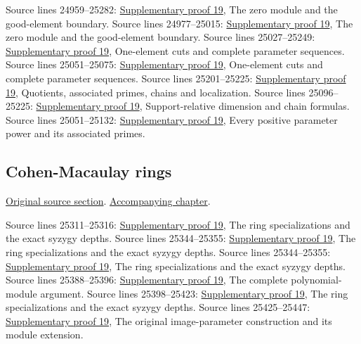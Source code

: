 \begin{AlgebraSourceRoutes}
 Source lines 24959--25282: \hyperlink{algebra_cm_modules_notes_20260928}{Supplementary proof 19}, The zero module and the good-element boundary.
 Source lines 24977--25015: \hyperlink{algebra_cm_modules_notes_20260928}{Supplementary proof 19}, The zero module and the good-element boundary.
 Source lines 25027--25249: \hyperlink{algebra_cm_modules_notes_20260928}{Supplementary proof 19}, One-element cuts and complete parameter sequences.
 Source lines 25051--25075: \hyperlink{algebra_cm_modules_notes_20260928}{Supplementary proof 19}, One-element cuts and complete parameter sequences.
 Source lines 25201--25225: \hyperlink{algebra_cm_modules_notes_20260928}{Supplementary proof 19}, Quotients, associated primes, chains and localization.
 Source lines 25096--25225: \hyperlink{algebra_cm_modules_notes_20260928}{Supplementary proof 19}, Support-relative dimension and chain formulas.
 Source lines 25051--25132: \hyperlink{algebra_cm_modules_notes_20260928}{Supplementary proof 19}, Every positive parameter power and its associated primes.
\end{AlgebraSourceRoutes}

\subsection{Cohen-Macaulay rings}
\hypertarget{algebra-source-section-CM-ring}{}
\noindent\href{https://github.com/stacks/stacks-project/blob/a04446e57ec1fbc252a871afcec7752fb2807b14/algebra.tex\#L25298}{Original source section}. \href{algebra.pdf\#nameddest=section-CM-ring}{Accompanying chapter}.

\begin{AlgebraSourceRoutes}
 Source lines 25311--25316: \hyperlink{algebra_cm_modules_notes_20260928}{Supplementary proof 19}, The ring specializations and the exact syzygy depths.
 Source lines 25344--25355: \hyperlink{algebra_cm_modules_notes_20260928}{Supplementary proof 19}, The ring specializations and the exact syzygy depths.
 Source lines 25344--25355: \hyperlink{algebra_cm_modules_notes_20260928}{Supplementary proof 19}, The ring specializations and the exact syzygy depths.
 Source lines 25388--25396: \hyperlink{algebra_cm_modules_notes_20260928}{Supplementary proof 19}, The complete polynomial-module argument.
 Source lines 25398--25423: \hyperlink{algebra_cm_modules_notes_20260928}{Supplementary proof 19}, The ring specializations and the exact syzygy depths.
 Source lines 25425--25447: \hyperlink{algebra_cm_modules_notes_20260928}{Supplementary proof 19}, The original image-parameter construction and its module extension.
\end{AlgebraSourceRoutes}

